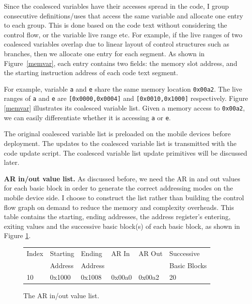 Since the coalesced variables have their accesses spread in the code, I group consecutive definitions/uses that access the same variable and allocate one entry to each group. This is done based on the code text without considering the control flow, or the variable live range etc. For example, if the live ranges of two coalesced variables overlap due to linear layout of control structures such as branches, then we allocate one entry for each segment. As shown in Figure~\ref{memvar}, each entry contains two fields: the memory slot address, and the starting instruction address of each code text segment. 

For example, variable {\tt a} and {\tt e} share the same memory location {\tt 0x00a2}. The live ranges of {\tt a} and {\tt e} are {\tt [0x0000,0x0004]} and {\tt [0x0010,0x1000]} respectively. Figure \ref{memvar} illustrates its coalesced variable list. Given a memory access to {\tt 0x00a2}, we can easily differentiate whether it is accessing {\tt a} or {\tt e}.

The original coalesced variable list is preloaded on the mobile devices before deployment. The updates to the coalesced variable list is transmitted with the code update script. The coalesced variable list update primitives will be discussed later.

{\bf AR in/out value list.} 
As discussed before, we need the AR in and out values for each basic block in order to generate the correct addressing modes on the mobile device side. I choose to construct the list rather than building the control flow graph on demand to reduce the memory and complexity overheads. This table contains the starting, ending addresses, the address register's entering, exiting values and the successive basic block(s) of each basic block, as shown in Figure \ref{bbtable}.

\begin{figure}[htdp]

\begin{center}
\begin{small}
\begin{tabular}{p{0.5in}p{1in}p{1in}p{1in}p{1in}p{1in}}
\hline
Index & Starting  & Ending  & AR In & AR Out & Successive \\
&Address&Address & & &Basic Blocks\\
\hline\hline
10 & 0x1000 & 0x1008 & 0x00a0 & 0x00a2 & 20\\ \hline
\end{tabular}
\end{small}
\end{center}
\caption{The AR in/out value list.}
\label{bbtable}
\end{figure}%

